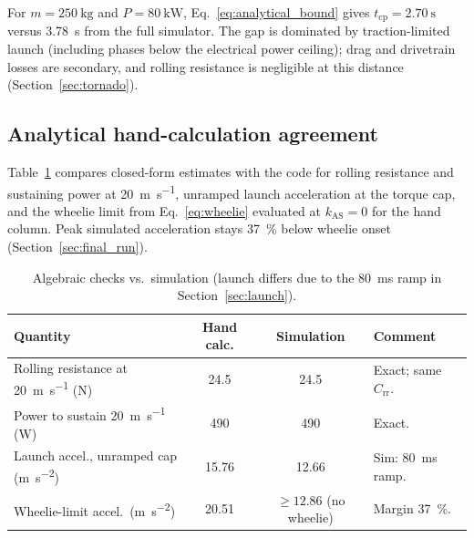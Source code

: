 For $m=\SI{250}{\kilo\gram}$ and $P=\SI{80}{\kilo\watt}$,
Eq.~\ref{eq:analytical_bound} gives $t_\text{cp}=\SI{2.70}{\second}$
versus \SI{3.78}{\second} from the full simulator. The gap is dominated
by traction-limited launch (including phases below the electrical power
ceiling); drag and drivetrain losses are secondary, and rolling
resistance is negligible at this distance (Section~\ref{sec:tornado}).

\subsection{Analytical hand-calculation agreement}
\label{sec:handcalc}

Table~\ref{tab:handcalc} compares closed-form estimates with the code for
rolling resistance and sustaining power at \SI{20}{\metre\per\second},
unramped launch acceleration at the torque cap, and the wheelie limit
from Eq.~\ref{eq:wheelie} evaluated at $k_\text{AS}=0$ for the hand column.
Peak simulated acceleration stays
\SI{37}{\percent} below wheelie onset (Section~\ref{sec:final_run}).

\begin{table}[H]
\centering
\caption{Algebraic checks vs.\ simulation (launch differs due to the
\SI{80}{\milli\second} ramp in Section~\ref{sec:launch}).}
\label{tab:handcalc}
\footnotesize
\setlength{\tabcolsep}{4pt}
\begin{tabularx}{\textwidth}{|>{\raggedright\arraybackslash\hsize=1.55\hsize}X|c|c|>{\raggedright\arraybackslash\hsize=0.45\hsize}X|}
\hline
\textbf{Quantity} & \textbf{Hand calc.} & \textbf{Simulation} & \textbf{Comment} \\
\hline
Rolling resistance at \SI{20}{\metre\per\second} (\si{\newton})
  & 24.5 & 24.5 & Exact; same $C_\text{rr}$. \\
Power to sustain \SI{20}{\metre\per\second} (\si{\watt})
  & 490 & 490 & Exact. \\
Launch accel., unramped cap (\si{\metre\per\second\squared})
  & 15.76 & 12.66 & Sim: \SI{80}{\milli\second} ramp. \\
Wheelie-limit accel.\ (\si{\metre\per\second\squared})
  & 20.51 & $\ge 12.86$ (no wheelie) & Margin \SI{37}{\percent}. \\
\hline
\end{tabularx}
\end{table}

